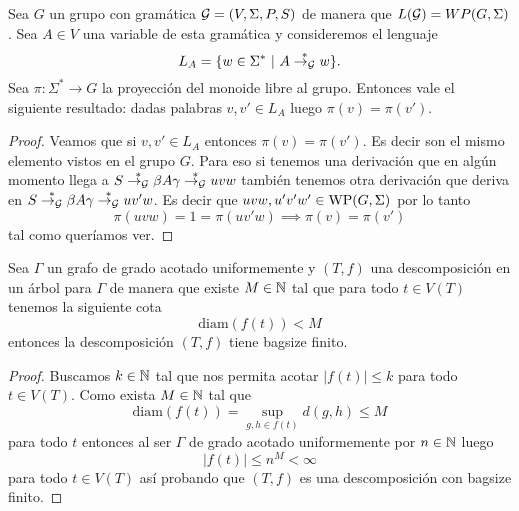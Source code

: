 \documentclass[tesis.tex]{subfiles}
\begin{document}
\begin{lema}\label{palabras-wp}
	Sea $G$ un grupo \ic con gramática ${\cal G} = (V, \Sigma, P, S)$ de manera que $L({\cal G}) = WP(G,\Sigma)$.
	Sea $A \in V$ una variable de esta gramática y consideremos el lenguaje
	\[
	L_A = \{ w \in \Sigma^*  \ | \ A \overset{*}{\to_{\cal G}} w  \}.
	\]
	Sea $\pi:\Sigma^* \to G$ la proyección del monoide libre al grupo.
	Entonces vale el siguiente resultado:
	dadas palabras $v,v' \in L_{A}$ luego $\pi(v) = \pi(v')$.
\end{lema}

\begin{proof}
	Veamos que si $v,v' \in L_A$ entonces $\pi(v){=} \pi(v')$. 
	Es decir son el mismo elemento vistos en el grupo $G$. 
	Para eso si tenemos una derivación que en algún momento llega a $S \overset{*}{\to_{\cal G}} \beta A \gamma \overset{*}{\to_{\cal G}} uvw$ también tenemos otra derivación que deriva en $S \overset{*}{\to_{\cal G}} \beta A \gamma  \overset{*}{\to_{\cal G}} uv'w$. 
	Es decir que $uvw, u'v'w' \in \text{WP}(G, \Sigma)$ por lo tanto 
	\begin{equation*}
		\pi(uvw) = 1 = \pi(uv'w) \implies \pi(v) = \pi( v')
	\end{equation*}
	tal como queríamos ver.
\end{proof}

\begin{lema}\label{lema_tw_diam_bagsize}
	Sea $\Gamma$ un grafo de grado acotado uniformemente y 
	$(T,f)$ una descomposición en un árbol para $\Gamma$ de manera que existe $M \in \mathbb{N}$ tal que para todo $t \in V(T)$ tenemos la siguiente cota
	\[
		\text{diam}( f(t)) < M
	\]   
	entonces la descomposición $(T,f)$ tiene bagsize finito.
\end{lema}
\begin{proof}
	Buscamos $k \in \mathbb{N}$ tal que nos permita acotar $|f(t)| \le k$ para todo $t \in V(T)$. 
	Como exista $M \in \mathbb{N}$ tal que 
	\[
	\text{diam}(f(t)) =  \sup_{g,h \in f(t)} d(g,h) \le M
	\] 
	para todo $t$ 
	entonces al ser $\Gamma$ de grado acotado uniformemente por $n \in \mathbb{N}$ luego 
	\[
		|f(t)| \le n^{M} < \infty
	\]
	para todo $t \in V(T)$ así probando que $(T,f)$ es una descomposición con bagsize finito.
\end{proof}
\end{document}
